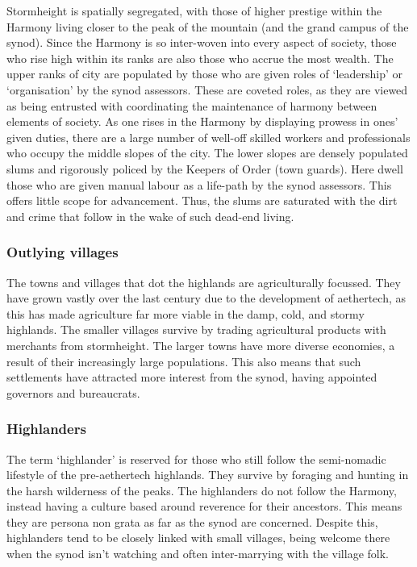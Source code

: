 \documentclass[a4paper,11pt,oneside]{book}
\begin{document}
Stormheight is spatially segregated, with those of higher prestige within the Harmony living closer to the peak of the mountain (and the grand campus of the synod). Since the Harmony is so inter-woven into every aspect of society, those who rise high within its ranks are also those who accrue the most wealth. The upper ranks of city are populated by those who are given roles of `leadership' or `organisation' by the synod assessors. These are coveted roles, as they are viewed as being entrusted with coordinating the maintenance of harmony between elements of society. As one rises in the Harmony by displaying prowess in ones' given duties, there are a large number of well-off skilled workers and professionals who occupy the middle slopes of the city. The lower slopes are densely populated slums and rigorously policed by the Keepers of Order (town guards). Here dwell those who are given manual labour as a life-path by the synod assessors. This offers little scope for advancement. Thus, the slums are saturated with the dirt and crime that follow in the wake of such dead-end living.   

\subsubsection{Outlying villages}
The towns and villages that dot the highlands are agriculturally focussed. They have grown vastly over the last century due to the development of aethertech, as this has made agriculture far more viable in the damp, cold, and stormy highlands. The smaller villages survive by trading agricultural products with merchants from stormheight. The larger towns have more diverse economies, a result of their increasingly large populations. This also means that such settlements have attracted more interest from the synod, having appointed governors and bureaucrats. 

\subsubsection{Highlanders}
The term `highlander' is reserved for those who still follow the semi-nomadic lifestyle of the pre-aethertech highlands. They survive by foraging and hunting in the harsh wilderness of the peaks. The highlanders do not follow the Harmony, instead having a culture based around reverence for their ancestors. This means they are persona non grata as far as the synod are concerned. Despite this, highlanders tend to be closely linked with small villages, being welcome there when the synod isn't watching and often inter-marrying with the village folk.   
\end{document}
